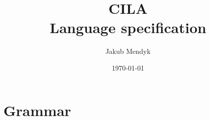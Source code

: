 \documentclass[11pt]{article}
\title{%
\LARGE{\textbf{CILA}} \\
    \Large{Language specification}
}
\author{Jakub Mendyk}
\date{\today}
\begin{document}
\maketitle

\section*{Grammar}

\newcommand{\tok}[1]{\textbf{#1}}

\newcommand{\Program}{program }
\newcommand{\Instruction}{instruction }
\newcommand{\Assignment}{assignment }

\newcommand{\LogicExpr}{logic\textsubscript{expr} }
\newcommand{\LogicSummand}{logic\textsubscript{summand} }
\newcommand{\LogicMultiplicand}{logic\textsubscript{multiplicand} }
\newcommand{\RelExpr}{rel\textsubscript{expr} }
\newcommand{\RelOp}{rel\textsubscript{op} }

\newcommand{\ArithExpr}{arith\textsubscript{expr} }
\newcommand{\ArithSummand}{arith\textsubscript{summand} }
\newcommand{\ArithMultiplicand}{arith\textsubscript{multiplicand} }
\newcommand{\SimpleExpr}{simple\textsubscript{expr} }
\newcommand{\SummOp}{summ\textsubscript{op} }
\newcommand{\MultOp}{mult\textsubscript{op} }

\newcommand{\Any}[1]{#1*}
\newcommand{\Some}[1]{#1+}
\end{document}
